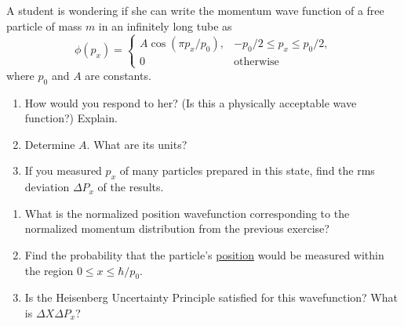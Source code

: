 \begin{exercise}
 A student is wondering if she can write the momentum wave function of a free particle of mass $m$ in an infinitely long tube as 
%
\begin{equation}
\phi(p_{x}) = \left\{\begin{array}{ll}
                 A\cos(\pi p_{x}/p_{0}), & -p_{0}/2 \leq p_{x} \leq p_{0}/2, \\
                 0 & \mbox{otherwise}
                 \end{array} \right.
\end{equation}
%
 where $p_{0}$  and $A$ are  constants.

\begin{enumerate}

\item  How would you respond to her? (Is this a physically acceptable wave function?)  Explain.

\item   Determine $A$.  What are its units?

\item If you measured  $p_{x}$ of many particles prepared in this state, find the rms deviation $\Delta P_{x}$ of the results.


\end{enumerate}

\end{exercise}


\begin{exercise}
\begin{enumerate}
\item What is the normalized position wavefunction corresponding to the normalized momentum distribution from the previous exercise?

\item  Find the probability that the particle's \underline{position} would be measured within the region $0 \leq x \leq \hbar/p_{0}$.

\item Is the Heisenberg Uncertainty Principle satisfied for this wavefunction? What is $\Delta X \Delta P_x$?

\end{enumerate}


\end{exercise}


